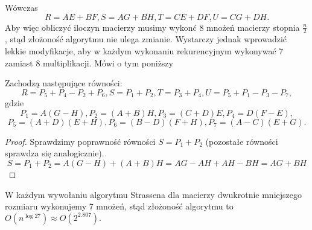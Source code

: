 Wówczas
$$ R=AE+BF, S=AG+BH, T=CE+DF, U=CG+DH.$$
Aby więc obliczyć iloczyn macierzy musimy wykonć 8 mnożeń macierzy stopnia
$\frac{n}{2}$, stąd złożoność algorytmu nie ulega zmianie. Wystarczy jednak
wprowadzić lekkie modyfikacje, aby  w każdym wykonaniu rekurencyjnym wykonywać
7 zamiast 8 multiplikacji. Mówi o tym poniższy
\begin{lm}{Zachodzą następujące równości:
$$R=P_5+P_4-P_2+P_6, S=P_1+P_2, T=P_3+P_4, U=P_5+P_1-P_3-P_7,$$
gdzie
$$P_1=A(G-H), P_2=(A+B)H, P_3=(C+D)E, P_4=D(F-E),$$
$$P_5=(A+D)(E+H), P_6=(B-D)(F+H), P_7 = (A-C)(E+G).$$}
\end{lm}
\begin{proof}
Sprawdzimy poprawność równości $S=P_1+P_2$ (pozostałe równości sprawdza się
analogicznie).
$$S=P_1+P_2=A(G-H)+(A+B)H=AG-AH+AH-BH=AG+BH$$
\end{proof}
W każdym wywołaniu algorytmu Strassena dla macierzy dwukrotnie mniejszego
rozmiaru wykonujemy 7 mnożeń, stąd złożoność algorytmu to $O(n^{\log{2}{7}})
\approx O(2^{2.807}).$
